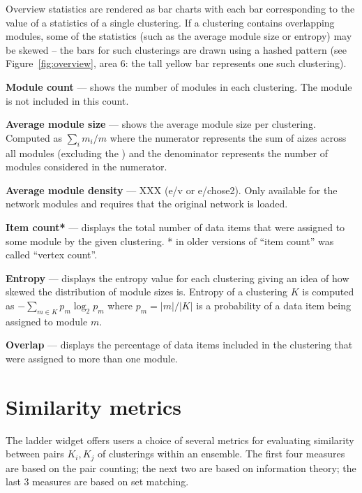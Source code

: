 Overview statistics are rendered as bar charts with each bar corresponding to 
the value of a statistics of a single clustering. If a clustering contains 
overlapping modules, some of the statistics (such as the average module size or
entropy) may be skewed -- the bars for such clusterings are drawn using a hashed
pattern (see Figure~\ref{fig:overview}, area 6: the tall yellow bar represents 
one such clustering).

\textbf{Module count} --- shows the number of modules in each clustering. The
\grabbag module is not included in this count.

\textbf{Average module size} --- shows the average module size per clustering. 
Computed as $ \sum_{i} m_{i}  / m $ where the numerator represents the sum of 
aizes across all modules (excluding the \grabbag) and the denominator represents
the number of modules considered in the numerator.

\textbf{Average module density} --- XXX (e/v or e/chose2). Only available for the network modules and 
requires that the original network is loaded.

\textbf{Item count*} --- displays the total number of data items that were 
assigned to some module by the given clustering. * in older versions of \coral
``item count'' was called ``vertex count''.

\textbf{Entropy} --- displays the entropy value for each clustering giving an 
idea of how skewed the distribution of module sizes is. Entropy of a clustering
$K$ is computed as $-\sum_{m \in K} p_{m} \log_{2} p_{m}$ where 
$p_{m} = |m| / |K|$ is a probability of a data item being assigned to module $m$.

\textbf{Overlap} --- displays the percentage of data items included in the 
clustering that were assigned to more than one module.


\section{Similarity metrics}
\label{sec:sim_metr}

The ladder widget offers users a choice of several metrics for evaluating 
similarity between pairs $K_{i}, K_{j}$ of clusterings within an ensemble. The 
first four measures are based on the pair counting; the next two are based on
information theory; the last 3 measures are based on set matching.

